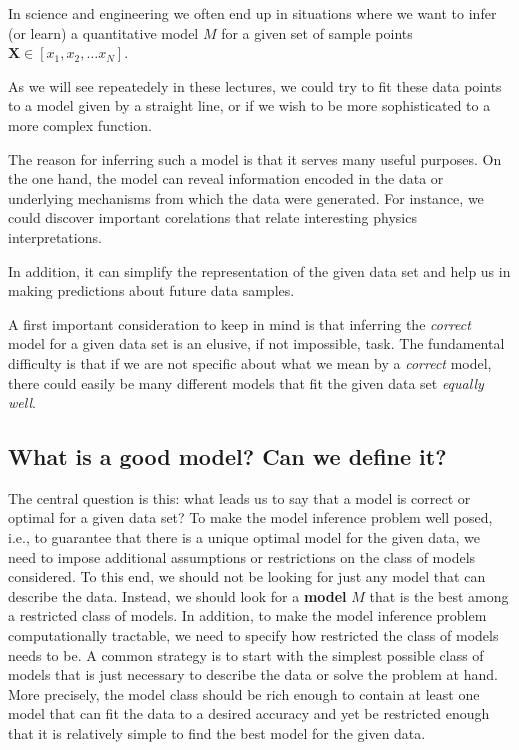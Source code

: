 \documentclass[%
oneside,                 %
final,                   %
10pt]{article}
\begin{document}
In science and engineering we often end up in situations where we want to infer (or learn) a
quantitative model $M$ for a given set of sample points $\bm{X} \in [x_1, x_2,\dots x_N]$.

As we will see repeatedely in these lectures, we could try to fit these data points to a model given by a
straight line, or if we wish to be more sophisticated to a more complex
function.

The reason for inferring such a model is that it
serves many useful purposes. On the one hand, the model can reveal information
encoded in the data or underlying mechanisms from which the data were generated. For instance, we could discover important
corelations that relate interesting physics interpretations.

In addition, it can simplify the representation of the given data set and help
us in making predictions about  future data samples.

A first important consideration to keep in mind is that inferring the \emph{correct} model
for a given data set is an elusive, if not impossible, task. The fundamental difficulty
is that if we are not specific about what we mean by a \emph{correct} model, there
could easily be many different models that fit the given data set \emph{equally well}.


\subsection{What is a good model? Can we define it?}


The central question is this: what leads us to say that a model is correct or
optimal for a given data set? To make the model inference problem well posed, i.e.,
to guarantee that there is a unique optimal model for the given data, we need to
impose additional assumptions or restrictions on the class of models considered. To
this end, we should not be looking for just any model that can describe the data.
Instead, we should look for a \textbf{model} $M$ that is the best among a restricted class
of models. In addition, to make the model inference problem computationally
tractable, we need to specify how restricted the class of models needs to be. A
common strategy is to start 
with the simplest possible class of models that is just necessary to describe the data
or solve the problem at hand. More precisely, the model class should be rich enough
to contain at least one model that can fit the data to a desired accuracy and yet be
restricted enough that it is relatively simple to find the best model for the given data.
\end{document}
